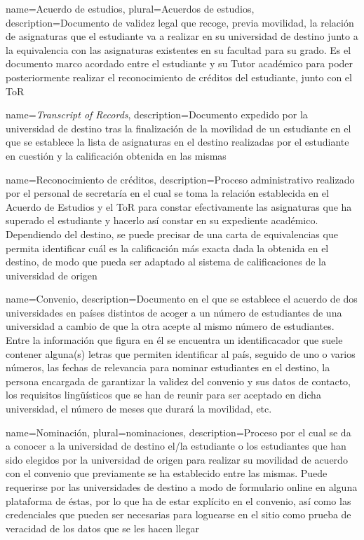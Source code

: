 \makeglossaries

{
	name=Acuerdo de estudios,
	plural=Acuerdos de estudios,
	description={Documento de validez legal que recoge, previa movilidad, la relación de asignaturas que el estudiante va a realizar en su universidad de destino junto a la equivalencia con las asignaturas existentes en su facultad para su grado. Es el documento marco acordado entre el estudiante y su \gls{Tutor} académico para poder posteriormente realizar el reconocimiento de créditos del estudiante, junto con el \gls{ToR}}
}

{
	name=\textit{Transcript of Records},
	description={Documento expedido por la universidad de destino tras la finalización de la movilidad de un estudiante en el que se establece la lista de asignaturas en el destino realizadas por el estudiante en cuestión y la calificación obtenida en las mismas}
}

{
	name=Reconocimiento de créditos,
	description={Proceso administrativo realizado por el personal de secretaría en el cual se toma la relación establecida en el Acuerdo de Estudios y el \gls{ToR} para constar efectivamente las asignaturas que ha superado el estudiante y hacerlo así constar en su expediente académico. Dependiendo del destino, se puede precisar de una carta de equivalencias que permita identificar cuál es la calificación más exacta dada la obtenida en el destino, de modo que pueda ser adaptado al sistema de calificaciones de la universidad de origen}
}

{
	name=Convenio,
	description={Documento en el que se establece el acuerdo de dos universidades en países distintos de acoger a un número de estudiantes de una universidad a cambio de que la otra acepte al mismo número de estudiantes. Entre la información que figura en él se encuentra un identificacador que suele contener alguna(s) letras que permiten identificar al país, seguido de uno o varios números, las fechas de relevancia para nominar estudiantes en el destino, la persona encargada de garantizar la validez del convenio y sus datos de contacto, los requisitos lingüísticos que se han de reunir para ser aceptado en dicha universidad, el número de meses que durará la movilidad, etc.}
}

{
	name=Nominación,
	plural=nominaciones,
	description={Proceso por el cual se da a conocer a la universidad de destino el/la estudiante o los estudiantes que han sido elegidos por la universidad de origen para realizar su movilidad de acuerdo con el convenio que previamente se ha establecido entre las mismas. Puede requerirse por las universidades de destino a modo de formulario online en alguna plataforma de éstas, por lo que ha de estar explícito en el convenio, así como las credenciales que pueden ser necesarias para loguearse en el sitio como prueba de veracidad de los datos que se les hacen llegar}
}

